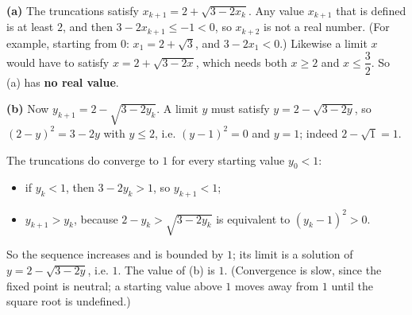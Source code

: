 \textbf{(a)} The truncations satisfy $x_{k+1}=2+\sqrt{3-2x_k}$. Any value $x_{k+1}$ that is defined is at least $2$, and then $3-2x_{k+1}\le-1<0$, so $x_{k+2}$ is not a real number. (For example, starting from $0$: $x_1=2+\sqrt3$, and $3-2x_1<0$.) Likewise a limit $x$ would have to satisfy $x=2+\sqrt{3-2x}$, which needs both $x\ge2$ and $x\le\dfrac32$. So (a) has \textbf{no real value}.

\textbf{(b)} Now $y_{k+1}=2-\sqrt{3-2y_k}$. A limit $y$ must satisfy $y=2-\sqrt{3-2y}$, so $(2-y)^2=3-2y$ with $y\le2$, i.e. $(y-1)^2=0$ and $y=1$; indeed $2-\sqrt{1}=1$.

The truncations do converge to $1$ for every starting value $y_0<1$:
\begin{itemize}
\item if $y_k<1$, then $3-2y_k>1$, so $y_{k+1}<1$;
\item $y_{k+1}>y_k$, because $2-y_k>\sqrt{3-2y_k}$ is equivalent to $(y_k-1)^2>0$.
\end{itemize}
So the sequence increases and is bounded by $1$; its limit is a solution of $y=2-\sqrt{3-2y}$, i.e. $1$. The value of (b) is $\boxed{1}$. (Convergence is slow, since the fixed point is neutral; a starting value above $1$ moves away from $1$ until the square root is undefined.)
